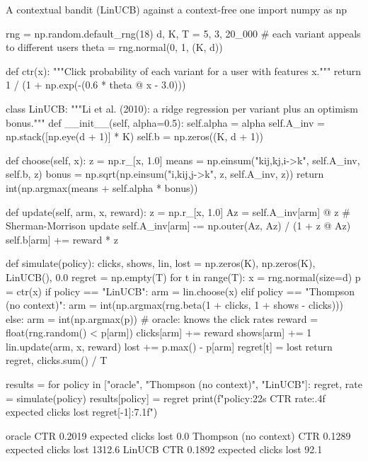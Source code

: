 \begin{pylisting}[label={lst:linucb}]{A contextual bandit (LinUCB) against a context-free one}
import numpy as np

rng = np.random.default_rng(18)
d, K, T = 5, 3, 20_000
# each variant appeals to different users
theta = rng.normal(0, 1, (K, d))

def ctr(x):
    """Click probability of each variant for a user with features x."""
    return 1 / (1 + np.exp(-(0.6 * theta @ x - 3.0)))

class LinUCB:
    """Li et al. (2010): a ridge regression per variant plus an optimism bonus."""
    def __init__(self, alpha=0.5):
        self.alpha = alpha
        self.A_inv = np.stack([np.eye(d + 1)] * K)
        self.b = np.zeros((K, d + 1))

    def choose(self, x):
        z = np.r_[x, 1.0]
        means = np.einsum("kij,kj,i->k", self.A_inv, self.b, z)
        bonus = np.sqrt(np.einsum("i,kij,j->k", z, self.A_inv, z))
        return int(np.argmax(means + self.alpha * bonus))

    def update(self, arm, x, reward):
        z = np.r_[x, 1.0]
        Az = self.A_inv[arm] @ z                       # Sherman-Morrison update
        self.A_inv[arm] -= np.outer(Az, Az) / (1 + z @ Az)
        self.b[arm] += reward * z

def simulate(policy):
    clicks, shows, lin, lost = np.zeros(K), np.zeros(K), LinUCB(), 0.0
    regret = np.empty(T)
    for t in range(T):
        x = rng.normal(size=d)
        p = ctr(x)
        if policy == "LinUCB":
            arm = lin.choose(x)
        elif policy == "Thompson (no context)":
            arm = int(np.argmax(rng.beta(1 + clicks, 1 + shows - clicks)))
        else:
            arm = int(np.argmax(p))                    # oracle: knows the click rates
        reward = float(rng.random() < p[arm])
        clicks[arm] += reward
        shows[arm] += 1
        lin.update(arm, x, reward)
        lost += p.max() - p[arm]
        regret[t] = lost
    return regret, clicks.sum() / T

results = {}
for policy in ["oracle", "Thompson (no context)", "LinUCB"]:
    regret, rate = simulate(policy)
    results[policy] = regret
    print(f"{policy:22s} CTR {rate:.4f}   expected clicks lost {regret[-1]:7.1f}")
\end{pylisting}
\begin{pyoutput}
oracle                 CTR 0.2019   expected clicks lost     0.0
Thompson (no context)  CTR 0.1289   expected clicks lost  1312.6
LinUCB                 CTR 0.1892   expected clicks lost    92.1
\end{pyoutput}

